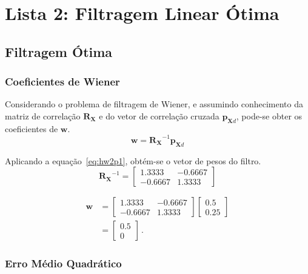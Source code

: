 \section{Lista 2: Filtragem Linear Ótima}


\subsection{Filtragem Ótima}


\subsubsection*{Coeficientes de Wiener}

Considerando o problema de filtragem de Wiener, e assumindo conhecimento da matriz de correlação $\mathbf{R_{X}}$ e do vetor de correlação cruzada $\mathbf{p}_{\mathbf{X} d}$, pode-se obter os coeficientes de $\mathbf{w}$.
\begin{equation} 
    \mathbf{w} = \mathbf{R_{X}}^{-1} \mathbf{p}_{\mathbf{X} d} \label{eq:hw2p1}
\end{equation}

Aplicando a equação~\ref{eq:hw2p1}, obtém-se o vetor de pesos do filtro.
\begin{equation*}
    \mathbf{R_{X}}^{-1} =  \left[ \begin{matrix} 1.3333 & -0.6667 \\ -0.6667 & 1.3333 \end{matrix} \right]
\end{equation*}

\begin{align*} 
    \mathbf{w} &= \left[ \begin{matrix} 1.3333 & -0.6667 \\ -0.6667 & 1.3333 \end{matrix} \right] \left[ \begin{matrix} 0.5 \\ 0.25 \end{matrix} \right] \\
        &= \left[ \begin{matrix} 0.5 \\ 0 \end{matrix} \right] \, .
\end{align*}


\subsubsection*{Erro Médio Quadrático}

